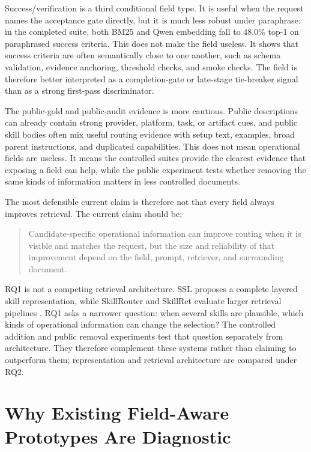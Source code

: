 Success/verification is a third conditional field type. It is useful when the request names the acceptance gate directly, but it is much less robust under paraphrase: in the completed suite, both BM25 and Qwen embedding fall to 48.0\% top-1 on paraphrased success criteria. This does not make the field useless. It shows that success criteria are often semantically close to one another, such as schema validation, evidence anchoring, threshold checks, and smoke checks. The field is therefore better interpreted as a completion-gate or late-stage tie-breaker signal than as a strong first-pass discriminator.

The public-gold and public-audit evidence is more cautious. Public descriptions can already contain strong provider, platform, task, or artifact cues, and public skill bodies often mix useful routing evidence with setup text, examples, broad parent instructions, and duplicated capabilities. This does not mean operational fields are useless. It means the controlled suites provide the clearest evidence that exposing a field can help, while the public experiment tests whether removing the same kinds of information matters in less controlled documents.

The most defensible current claim is therefore not that every field always improves retrieval. The current claim should be:

\begin{quote}
Candidate-specific operational information can improve routing when it is visible and matches the request, but the size and reliability of that improvement depend on the field, prompt, retriever, and surrounding document.
\end{quote}

RQ1 is not a competing retrieval architecture. SSL proposes a complete layered skill representation, while SkillRouter and SkillRet evaluate larger retrieval pipelines \cite{liang2026ssl,zheng2026skillrouter,cho2026skillret}. RQ1 asks a narrower question: when several skills are plausible, which kinds of operational information can change the selection? The controlled addition and public removal experiments test that question separately from architecture. They therefore complement these systems rather than claiming to outperform them; representation and retrieval architecture are compared under RQ2.

\section{Why Existing Field-Aware Prototypes Are Diagnostic}

